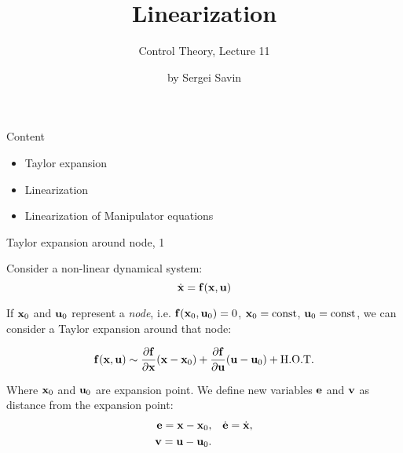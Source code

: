 \documentclass{beamer}
\title{Linearization}
\subtitle{Control Theory, Lecture 11}
\author{by Sergei Savin}
\date{\mydate}
\begin{document}
\maketitle


\begin{frame}{Content}
\begin{itemize}
	\item Taylor expansion
	\item Linearization
	\item Linearization of Manipulator equations
\end{itemize}
\end{frame}






\begin{frame}{Taylor expansion around node, 1}
	\begin{flushleft}
		
		Consider a non-linear dynamical system:
		\begin{equation}
			\dot{\mathbf{x}} = \mathbf{f}(\mathbf{x}, \mathbf{u})
		\end{equation}
	
		If $\mathbf{x}_0$ and $\mathbf{u}_0$ represent a \emph{node}, i.e. $\mathbf{f}(\mathbf{x}_0, \mathbf{u}_0) = 0$, $\mathbf{x}_0 = \text{const}$, $\mathbf{u}_0 = \text{const}$, we can consider a Taylor expansion around that node:
	
		\begin{equation}
			\mathbf{f}(\mathbf{x}, \mathbf{u}) 	\sim 
			\frac{\partial \mathbf{f}}{\partial \mathbf{x}} (\mathbf{x} - \mathbf{x}_0) + 
			\frac{\partial \mathbf{f}}{\partial \mathbf{u}} (\mathbf{u} - \mathbf{u}_0) + \text{H.O.T.}
		\end{equation}
	
		Where $\mathbf{x}_0$ and $\mathbf{u}_0$ are expansion point. We define new variables $\mathbf{e}$ and $\mathbf{v}$ as distance from the expansion point:
		\begin{align}
			\mathbf{e} = \mathbf{x} - \mathbf{x}_0, &\ \ \ \dot{\mathbf{e}} = \dot{\mathbf{x}}, \\
			\mathbf{v} = \mathbf{u} - \mathbf{u}_0. &\\
		\end{align}
		
		
	\end{flushleft}
\end{frame}
\end{document}
